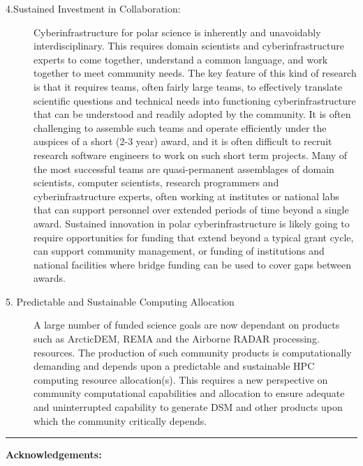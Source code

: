\documentclass[10pt,letterpaper,draft]{article}
\begin{document}
\begin{description}
\item[4.Sustained Investment in Collaboration:]
Cyberinfrastructure for polar science is inherently and unavoidably interdisciplinary. This requires domain scientists and cyberinfrastructure experts to come together, understand a common language, and work together to meet community needs. The key feature of this kind of research is that it requires teams, often fairly large teams, to effectively translate scientific questions and technical needs into functioning cyberinfrastructure that can be understood and readily adopted by the community. It is often challenging to assemble such teams and operate efficiently under the auspices of a short (2-3 year) award, and it is often difficult to recruit research software engineers to work on such short term projects. Many of the most successful teams are quasi-permanent assemblages of domain scientists, computer scientists, research programmers and cyberinfrastructure experts, often working at institutes or national labs that can support personnel over extended periods of time beyond a single award. Sustained innovation in polar cyberinfrastructure is likely going to require opportunities for funding that extend beyond a typical grant cycle, can support community management, or funding of institutions and national facilities where bridge funding can be used to cover gaps between awards. 

\item[ 5. Predictable and Sustainable Computing Allocation]
A large number of funded science goals are now dependant on products such as ArcticDEM, REMA and the Airborne RADAR processing.  resources.   The production of such community products is computationally demanding and depends upon a predictable and sustainable HPC computing resource allocation(s). This requires a new perspective on community computational capabilities and allocation to ensure adequate and uninterrupted capability to generate DSM and other products upon which the community critically depends. 

\end{description}



\hspace{1.5cm}\rule{13.0cm}{0.8pt}

\vspace{0.5cm}

{\noindent \bf \small Acknowledgements:} 
\end{document}
